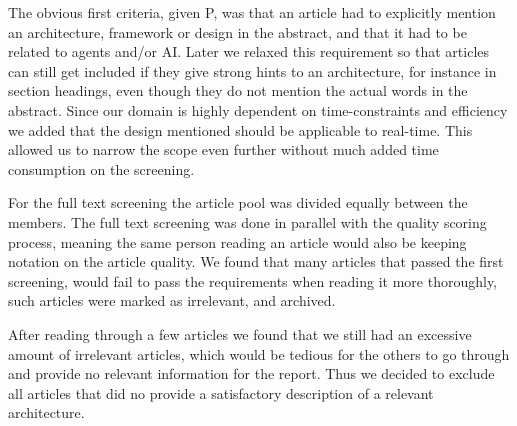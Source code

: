 The obvious first criteria, given P, was that an article had to explicitly mention an architecture, framework or design in the abstract, and that it had to be related to agents and/or AI. Later we relaxed this requirement so that articles can still get included if they give strong hints to an architecture, for instance in section headings, even though they do not mention the actual words in the abstract.
Since our domain is highly dependent on time-constraints and efficiency we added that the design mentioned should be applicable to real-time. This allowed us to narrow the scope even further without much added time consumption on the screening.

For the full text screening the article pool was divided equally between the members. The full text screening was done in parallel with the quality scoring process, meaning the same person reading an article would also be keeping notation on the article quality. 
We found that many articles that passed the first screening, would fail to pass the requirements when reading it more thoroughly, such articles were marked as irrelevant, and archived.

After reading through a few articles we found that we still had an excessive amount of irrelevant articles, which would be tedious for the others to go through and provide no relevant information for the report. Thus we decided to exclude all articles that did no provide a satisfactory description of a relevant architecture.

